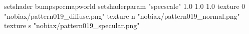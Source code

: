 setshader bumpspecmapworld
setshaderparam "specscale" 1.0 1.0 1.0
   texture 0 "nobiax/pattern019_diffuse.png"
   texture n "nobiax/pattern019_normal.png"
   texture s "nobiax/pattern019_specular.png"